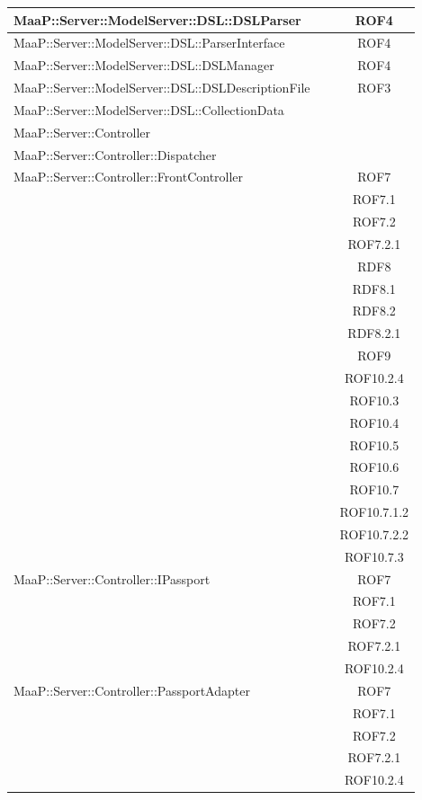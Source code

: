 \begin{center}
\begin{longtable}{|p{0.8\linewidth}|c|}
\midrule
MaaP::Server::ModelServer::DSL::DSLParser
& ROF4\\

\midrule
MaaP::Server::ModelServer::DSL::ParserInterface
& ROF4\\

\midrule
MaaP::Server::ModelServer::DSL::DSLManager
& ROF4\\

\midrule
MaaP::Server::ModelServer::DSL::DSLDescriptionFile
& ROF3\\

\midrule
MaaP::Server::ModelServer::DSL::CollectionData
& \\

\midrule
MaaP::Server::Controller
& \\

\midrule
MaaP::Server::Controller::Dispatcher
& \\

\midrule
MaaP::Server::Controller::FrontController
& ROF7\\
& ROF7.1\\
& ROF7.2\\
& ROF7.2.1\\
& RDF8\\
& RDF8.1\\
& RDF8.2\\
& RDF8.2.1\\
& ROF9\\
& ROF10.2.4\\
& ROF10.3\\
& ROF10.4\\
& ROF10.5\\
& ROF10.6\\
& ROF10.7\\
& ROF10.7.1.2\\
& ROF10.7.2.2\\
& ROF10.7.3\\

\midrule
MaaP::Server::Controller::IPassport
& ROF7\\
& ROF7.1\\
& ROF7.2\\
& ROF7.2.1\\
& ROF10.2.4\\

\midrule
MaaP::Server::Controller::PassportAdapter
& ROF7\\
& ROF7.1\\
& ROF7.2\\
& ROF7.2.1\\
& ROF10.2.4\\


\end{longtable}
\end{center}
